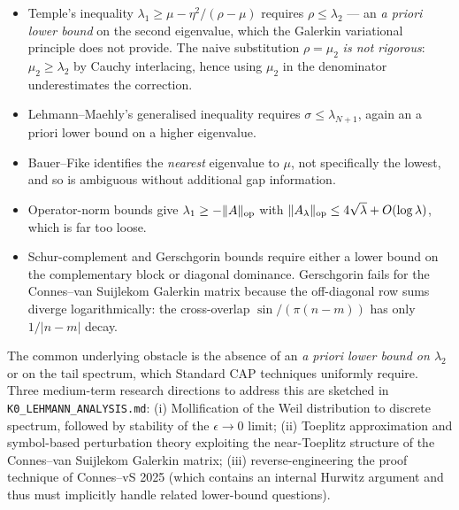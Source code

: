\documentclass[11pt,a4paper]{article}
\theoremstyle{remark}
\theoremstyle{plain}
\begin{document}
\begin{itemize}[leftmargin=*]
  \item Temple's inequality
    $\lambda_1\geq\mu-\eta^2/(\rho-\mu)$ requires
    $\rho\leq\lambda_2$ — an \emph{a priori lower bound} on the second
    eigenvalue, which the Galerkin variational principle does not
    provide.  The naive substitution $\rho=\mu_2$
    \emph{is not rigorous}: $\mu_2\geq\lambda_2$ by Cauchy
    interlacing, hence using $\mu_2$ in the denominator underestimates
    the correction.

  \item Lehmann--Maehly's generalised inequality requires
    $\sigma\leq\lambda_{N+1}$, again an a priori lower bound on a
    higher eigenvalue.

  \item Bauer--Fike identifies the \emph{nearest} eigenvalue to $\mu$,
    not specifically the lowest, and so is ambiguous without
    additional gap information.

  \item Operator-norm bounds give $\lambda_1\geq-\|A\|_{\rm op}$ with
    $\|A_\lambda\|_{\rm op}\le 4\sqrt\lambda + O(\log\lambda)$, which
    is far too loose.

  \item Schur-complement and Gerschgorin bounds require either a
    lower bound on the complementary block or diagonal dominance.
    Gerschgorin fails for the Connes--van Suijlekom Galerkin matrix
    because the off-diagonal row sums diverge logarithmically: the
    cross-overlap $\sin/(\pi(n-m))$ has only $1/|n-m|$ decay.
\end{itemize}

The common underlying obstacle is the absence of an
\emph{a priori lower bound on $\lambda_2$} or on the tail spectrum,
which Standard CAP techniques uniformly require.  Three medium-term
research directions to address this are sketched in
\texttt{K0\_LEHMANN\_ANALYSIS.md}: (i) Mollification of the Weil
distribution to discrete spectrum, followed by stability of the
$\epsilon\to 0$ limit; (ii) Toeplitz approximation and symbol-based
perturbation theory exploiting the near-Toeplitz structure of the
Connes--van Suijlekom Galerkin matrix; (iii) reverse-engineering the
proof technique of Connes--vS 2025 (which contains an internal Hurwitz
argument and thus must implicitly handle related lower-bound
questions).
\end{document}
